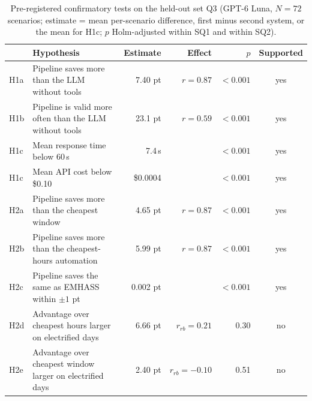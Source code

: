\documentclass[12pt,a4paper]{report}
\begin{document}
\begin{table}[h!]
\caption{Pre-registered confirmatory tests on the held-out set Q3 (GPT-6 Luna, $N = 72$ scenarios; estimate = mean per-scenario difference, first minus second system, or the mean for H1c; $p$ Holm-adjusted within SQ1 and within SQ2).}
\label{tab:q3-tests}
\small
\begin{tabularx}{\textwidth}{l>{\raggedright\arraybackslash}Xrrrc}
\toprule
& Hypothesis & Estimate & Effect & $p$ & Supported \\
\midrule
H1a & Pipeline saves more than the LLM without tools & 7.40 pt & $r = 0.87$ & $<0.001$ & yes \\
H1b & Pipeline is valid more often than the LLM without tools & 23.1 pt & $r = 0.59$ & $<0.001$ & yes \\
H1c & Mean response time below 60\,s & 7.4\,s & & $<0.001$ & yes \\
H1c & Mean API cost below \$0.10 & \$0.0004 & & $<0.001$ & yes \\
\midrule
H2a & Pipeline saves more than the cheapest window & 4.65 pt & $r = 0.87$ & $<0.001$ & yes \\
H2b & Pipeline saves more than the cheapest-hours automation & 5.99 pt & $r = 0.87$ & $<0.001$ & yes \\
H2c & Pipeline saves the same as EMHASS within $\pm 1$ pt & 0.002 pt & & $<0.001$ & yes \\
H2d & Advantage over cheapest hours larger on electrified days & 6.66 pt & $r_{rb} = 0.21$ & 0.30 & no \\
H2e & Advantage over cheapest window larger on electrified days & 2.40 pt & $r_{rb} = -0.10$ & 0.51 & no \\
\bottomrule
\end{tabularx}
\end{table}
\end{document}
